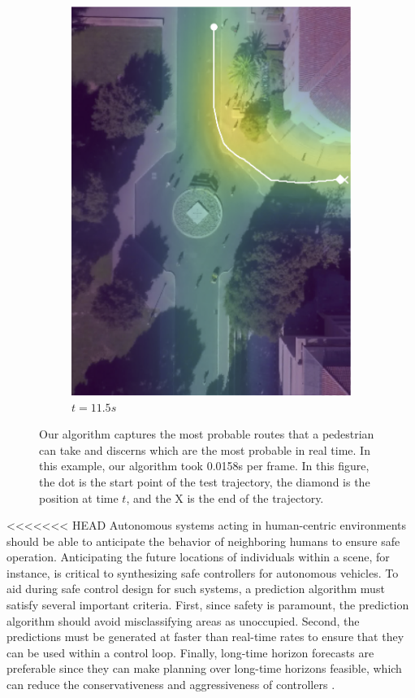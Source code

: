 \documentclass[letterpaper,10pt,conference]{ieeeconf}
\begin{document}
\begin{figure}
\begin{subfigure}[b]{.45\linewidth}
		\includegraphics[width=\linewidth]{./figures/FirstPage/gates_1_2_t=345.png}
		\caption{$t=11.5s$}
	\end{subfigure}
	\caption{Our algorithm captures the most probable routes that a pedestrian can take and discerns which are the most probable in real time. In this example, our algorithm took 0.0158s per frame.  In this figure, the dot is the start point of the test trajectory, the diamond is the position at time $t$, and the X is the end of the trajectory.}
	\label{fig:gates-1-2}
\end{figure}

<<<<<<< HEAD
Autonomous systems acting in human-centric environments should be able to anticipate the behavior of neighboring humans to ensure safe operation. 
Anticipating the future locations of individuals within a scene, for instance, is critical to synthesizing safe controllers for autonomous vehicles.
To aid during safe control design for such systems, a prediction algorithm must satisfy several important criteria.
First, since safety is paramount, the prediction algorithm should avoid misclassifying areas as unoccupied.
Second, the predictions must be generated at faster than real-time rates to ensure that they can be used within a control loop.
Finally, long-time horizon forecasts are preferable since they can make planning over long-time horizons feasible, which can reduce the conservativeness and aggressiveness of controllers \cite{}.
\end{document}
